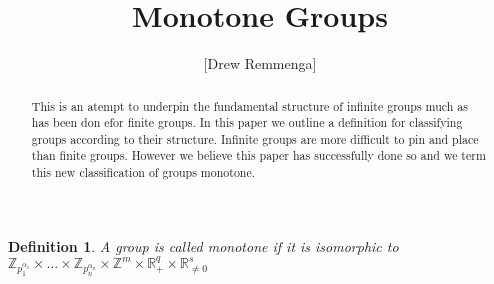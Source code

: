 \documentclass[10pt, oneside]{article}
\title{Monotone Groups}
\author{[Drew Remmenga]}
\newcommand{\R}{\mathbb{R}}
\newcommand{\Z}{\mathbb{Z}}
\newtheorem{defn}{Definition}
\begin{document}
\maketitle

\vspace{.25in}
\begin{abstract}
    This is an atempt to underpin the fundamental structure of infinite groups much as has been don efor finite groups. In this paper we outline a definition for classifying groups according to their structure. Infinite groups are more difficult to pin and place than finite groups. However we believe this paper has successfully done so and we term this new classification of groups monotone. 
\end{abstract}
\begin{defn}
    A group is called monotone if it is isomorphic to $\Z_{p_{1}^{\alpha_{1}}} \times ... \times \Z_{p_{n}^{\alpha_{n}}} \times \Z^{m} \times \R_{+}^{q} \times \R_{\neq 0}^{s}$
\end{defn}
\end{document}
